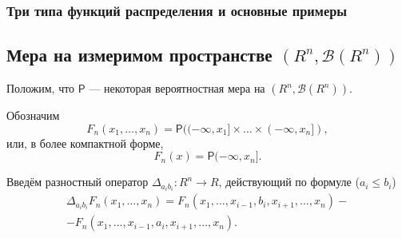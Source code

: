 \subsubsection{Три типа функций распределения и основные примеры}


\subsection{Мера на измеримом пространстве $ (R^n, \mathscr B(R^n)) $}
Положим, что $ \mathsf P $ --- некоторая вероятностная мера на $ (R^n, \mathscr
B(R^n))$.

Обозначим 
\[
  F_n(x_1, \ldots, x_n) = \mathsf P((-\infty, x_1] \times \ldots \times(-\infty,
  x_n]),
\]
или, в более компактной форме, 
\[
  F_n(x) = \mathsf P(-\infty, x_n].
\]

Введём разностный оператор $ \Delta_{a_ib_i}\colon R^n \to R $, действующий по
формуле ($ a_i \leqslant b_i $)  
\begin{multline*}
  \Delta_{a_ib_i} F_n(x_1, \ldots, x_n) = F_n(x_1, \ldots, x_{i-1}, b_i,
  x_{i+1}, \ldots, x_n) - \\ - F_n(x_1, \ldots, x_{i-1}, a_i, x_{i+1}, \ldots,
  x_n).
\end{multline*}







  




  

 






